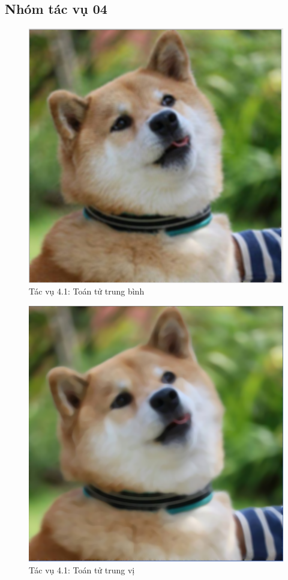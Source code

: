 \documentclass{article}
\begin{document}
	\subsection{Nhóm tác vụ 04}
	\begin{figure}[H]
		\centering
		\includegraphics[scale = 0.4]{41mean}
		\caption{Tác vụ 4.1: Toán tử trung bình}
	\end{figure}
	\begin{figure}[H]
		\centering
		\includegraphics[scale = 0.4]{41median}
		\caption{Tác vụ 4.1: Toán tử trung vị}
	\end{figure}
\end{document}
